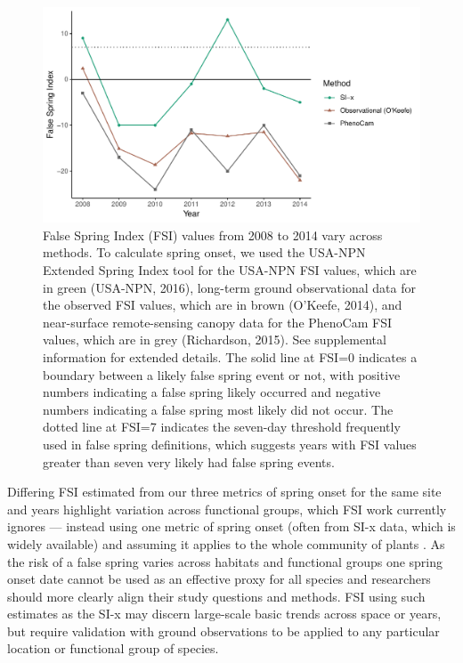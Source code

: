 \documentclass{article}\usepackage[]{graphicx}\usepackage[]{color}
\makeatletter
\def\maxwidth{ %
  \ifdim\Gin@nat@width>\linewidth
    \linewidth
  \else
    \Gin@nat@width
  \fi
}
\makeatother
\begin{document}
\begin{figure}[H]

{\centering \includegraphics[width=\maxwidth]{figure/fsifig-1} 

}

\caption[False Spring Index (FSI) values from 2008 to 2014 vary across methods]{False Spring Index (FSI) values from 2008 to 2014 vary across methods. To calculate spring onset, we used the USA-NPN Extended Spring Index tool for the USA-NPN FSI values, which are in green (USA-NPN, 2016), long-term ground observational data for the observed FSI values, which are in brown (O'Keefe, 2014), and near-surface remote-sensing canopy data for the PhenoCam FSI values, which are in grey (Richardson, 2015). See supplemental information for extended details. The solid line at FSI=0 indicates a boundary between a likely false spring event or not, with positive numbers indicating a false spring likely occurred and negative numbers indicating a false spring most likely did not occur. The dotted line at FSI=7 indicates the seven-day threshold frequently used in false spring definitions, which suggests years with FSI values greater than seven very likely had false spring events.}\label{fig:fsifig}
\end{figure}



Differing FSI estimated from our three metrics of spring onset for the same site and years highlight variation across functional groups, which FSI work currently ignores --- instead using one metric of spring onset (often from SI-x data, which is widely available) and assuming it applies to the whole community of plants \citep{Allstadt2015, Marino2011, Mehdipoor2017, Peterson2014}. As the risk of a false spring varies across habitats and functional groups \citep{Martin2010} one spring onset date cannot be used as an effective proxy for all species and researchers should more clearly align their study questions and methods. FSI using such estimates as the SI-x may discern large-scale basic trends across space or years, but require validation with ground observations to be applied to any particular location or functional group of species. 
\end{document}
